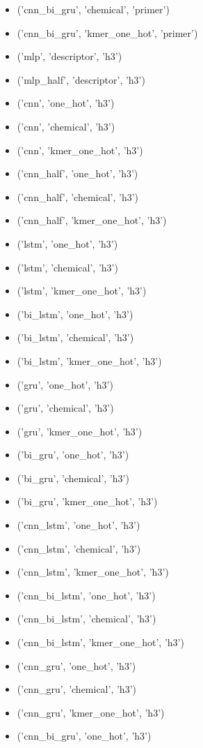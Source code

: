 \begin{itemize}
    \item ('cnn\_bi\_gru', 'chemical', 'primer')
    \item ('cnn\_bi\_gru', 'kmer\_one\_hot', 'primer')
    \item ('mlp', 'descriptor', 'h3')
    \item ('mlp\_half', 'descriptor', 'h3')
    \item ('cnn', 'one\_hot', 'h3')
    \item ('cnn', 'chemical', 'h3')
    \item ('cnn', 'kmer\_one\_hot', 'h3')
    \item ('cnn\_half', 'one\_hot', 'h3')
    \item ('cnn\_half', 'chemical', 'h3')
    \item ('cnn\_half', 'kmer\_one\_hot', 'h3')
    \item ('lstm', 'one\_hot', 'h3')
    \item ('lstm', 'chemical', 'h3')
    \item ('lstm', 'kmer\_one\_hot', 'h3')
    \item ('bi\_lstm', 'one\_hot', 'h3')
    \item ('bi\_lstm', 'chemical', 'h3')
    \item ('bi\_lstm', 'kmer\_one\_hot', 'h3')
    \item ('gru', 'one\_hot', 'h3')
    \item ('gru', 'chemical', 'h3')
    \item ('gru', 'kmer\_one\_hot', 'h3')
    \item ('bi\_gru', 'one\_hot', 'h3')
    \item ('bi\_gru', 'chemical', 'h3')
    \item ('bi\_gru', 'kmer\_one\_hot', 'h3')
    \item ('cnn\_lstm', 'one\_hot', 'h3')
    \item ('cnn\_lstm', 'chemical', 'h3')
    \item ('cnn\_lstm', 'kmer\_one\_hot', 'h3')
    \item ('cnn\_bi\_lstm', 'one\_hot', 'h3')
    \item ('cnn\_bi\_lstm', 'chemical', 'h3')
    \item ('cnn\_bi\_lstm', 'kmer\_one\_hot', 'h3')
    \item ('cnn\_gru', 'one\_hot', 'h3')
    \item ('cnn\_gru', 'chemical', 'h3')
    \item ('cnn\_gru', 'kmer\_one\_hot', 'h3')
    \item ('cnn\_bi\_gru', 'one\_hot', 'h3')

\end{itemize}

